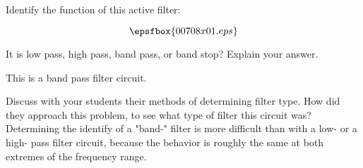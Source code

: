 

Identify the function of this active filter:

$$\epsfbox{00708x01.eps}$$

It is low pass, high pass, band pass, or band stop?  Explain your answer.







This is a band pass filter circuit.







Discuss with your students their methods of determining filter type.  How did they approach this problem, to see what type of filter this circuit was?  Determining the identify of a "band-" filter is more difficult than with a low- or a high- pass filter circuit, because the behavior is roughly the same at both extremes of the frequency range.




